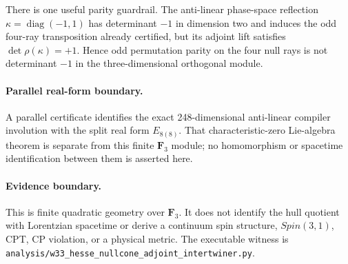 There is one useful parity guardrail. The anti-linear phase-space reflection
\(\kappa=\operatorname{diag}(-1,1)\) has determinant \(-1\) in dimension two
and induces the odd four-ray transposition already certified, but its adjoint
lift satisfies \(\det\rho(\kappa)=+1\). Hence odd permutation parity on the
four null rays is not determinant \(-1\) in the three-dimensional orthogonal
module.

\paragraph{Parallel real-form boundary.}
A parallel certificate identifies the exact 248-dimensional anti-linear compiler
involution with the split real form \(E_{8(8)}\). That characteristic-zero
Lie-algebra theorem is separate from this finite \(\mathbf F_3\) module; no
homomorphism or spacetime identification between them is asserted here.

\paragraph{Evidence boundary.}
This is finite quadratic geometry over \(\mathbf F_3\). It does not identify
the hull quotient with Lorentzian spacetime or derive a continuum spin
structure, \(Spin(3,1)\), CPT, CP violation, or a physical metric.
The executable witness is
\texttt{analysis/w33\_hesse\_nullcone\_adjoint\_intertwiner.py}.

